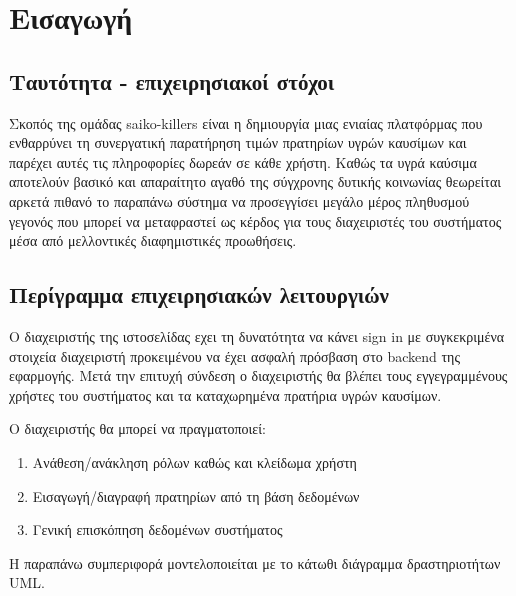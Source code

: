 \section{Εισαγωγή}

\subsection{Ταυτότητα - επιχειρησιακοί στόχοι}

Σκοπός της ομάδας saiko-killers είναι η δημιουργία μιας ενιαίας πλατφόρμας που ενθαρρύνει τη συνεργατική παρατήρηση τιμών πρατηρίων υγρών καυσίμων και παρέχει αυτές τις πληροφορίες δωρεάν σε κάθε χρήστη. Καθώς τα υγρά καύσιμα αποτελούν βασικό και απαραίτητο αγαθό της σύγχρονης δυτικής κοινωνίας θεωρείται αρκετά πιθανό το παραπάνω σύστημα να προσεγγίσει μεγάλο μέρος πληθυσμού γεγονός που μπορεί να μεταφραστεί ως κέρδος για τους διαχειριστές του συστήματος μέσα από μελλοντικές διαφημιστικές προωθήσεις.

\subsection{Περίγραμμα επιχειρησιακών λειτουργιών}

Ο διαχειριστής της ιστοσελίδας εχει τη δυνατότητα να κάνει sign in με συγκεκριμένα στοιχεία διαχειριστή προκειμένου να έχει ασφαλή πρόσβαση στο backend της εφαρμογής.
Μετά την επιτυχή σύνδεση ο διαχειριστής θα βλέπει τους εγγεγραμμένους χρήστες του συστήματος και τα καταχωρημένα πρατήρια υγρών καυσίμων.

Ο διαχειριστής θα μπορεί να πραγματοποιεί: 
\begin{enumerate}
	\item Ανάθεση/ανάκληση ρόλων καθώς και κλείδωμα χρήστη
	\item Εισαγωγή/διαγραφή πρατηρίων από τη βάση δεδομένων
	\item Γενική επισκόπηση δεδομένων συστήματος
	
\end{enumerate}

Η παραπάνω συμπεριφορά μοντελοποιείται με το κάτωθι διάγραμμα δραστηριοτήτων UML.

